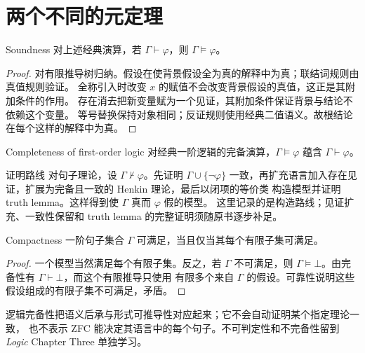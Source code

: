 \section{两个不同的元定理}
\begin{theorem}{Soundness}
对上述经典演算，若 \(\Gamma\vdash\varphi\)，则 \(\Gamma\models\varphi\)。
\end{theorem}
\begin{proof}
对有限推导树归纳。假设在使背景假设全为真的解释中为真；联结词规则由真值规则验证。
全称引入时改变 \(x\) 的赋值不会改变背景假设的真值，这正是其附加条件的作用。
存在消去把新变量赋为一个见证，其附加条件保证背景与结论不依赖这个变量。
等号替换保持对象相同；反证规则使用经典二值语义。故根结论在每个这样的解释中为真。
\end{proof}

\begin{theorem}{Completeness of first-order logic}
对经典一阶逻辑的完备演算，\(\Gamma\models\varphi\) 蕴含 \(\Gamma\vdash\varphi\)。
\end{theorem}
\begin{qlnote}{证明路线}
对句子理论，设 \(\Gamma\nvdash\varphi\)。先证明 \(\Gamma\cup\{\neg\varphi\}\)
一致，再扩充语言加入存在见证，扩展为完备且一致的 Henkin 理论，最后以闭项的等价类
构造模型并证明 truth lemma。这样得到使 \(\Gamma\) 真而 \(\varphi\) 假的模型。
这里记录的是构造路线；见证扩充、一致性保留和 truth lemma 的完整证明须随原书逐步补足。
\end{qlnote}

\begin{theorem}{Compactness}
一阶句子集合 \(\Gamma\) 可满足，当且仅当其每个有限子集可满足。
\end{theorem}
\begin{proof}
一个模型当然满足每个有限子集。反之，若 \(\Gamma\) 不可满足，则
\(\Gamma\models\bot\)。由完备性有 \(\Gamma\vdash\bot\)，而这个有限推导只使用
有限多个来自 \(\Gamma\) 的假设。可靠性说明这些假设组成的有限子集不可满足，矛盾。
\end{proof}

逻辑完备性把语义后承与形式可推导性对应起来；它不会自动证明某个指定理论一致，
也不表示 ZFC 能决定其语言中的每个句子。不可判定性和不完备性留到 \emph{Logic}
Chapter Three 单独学习。
